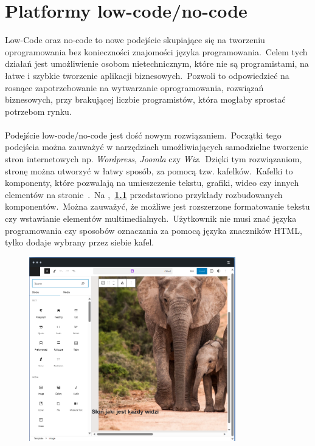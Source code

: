 \chapter{Platformy low-code/no-code}\label{cha:low}
Low-Code oraz no-code to nowe podejście skupiające się na tworzeniu oprogramowania bez konieczności znajomości języka programowania.\ Celem tych działań jest umożliwienie osobom nietechnicznym, które nie są programistami, na łatwe i szybkie tworzenie aplikacji biznesowych.\ Pozwoli to odpowiedzieć na rosnące zapotrzebowanie na wytwarzanie oprogramowania, rozwiązań biznesowych, przy brakującej liczbie programistów, która mogłaby sprostać potrzebom rynku.
\\ \\
Podejście low-code/no-code jest dość nowym rozwiązaniem.\ Początki tego podejścia można zauważyć w narzędziach umożliwiających samodzielne tworzenie stron internetowych np. \textit{Wordpress}, \textit{Joomla} czy \textit{Wix}.\ Dzięki tym rozwiązaniom, stronę można utworzyć w łatwy sposób, za pomocą tzw. kafelków.\ Kafelki to komponenty, które pozwalają na umieszczenie tekstu, grafiki, wideo czy innych elementów na stronie~\cite{Wordpress2023,Joomla2023,Wix2023}.\ Na ,~\textbf{\ref{fig:wp-plat}} przedstawiono przykłady rozbudowanych komponentów.\ Można zauważyć, że możliwe jest rozszerzone formatowanie tekstu czy wstawianie elementów multimedialnych.\ Użytkownik nie musi znać języka programowania czy sposobów oznaczania za pomocą języka znaczników HTML, tylko dodaje wybrany przez siebie kafel.

\begin{figure}[H]
    \centering
    \includegraphics[width=0.8\textwidth]{images/slon_wordpress}
    \label{fig:wp-plat}
\end{figure}

